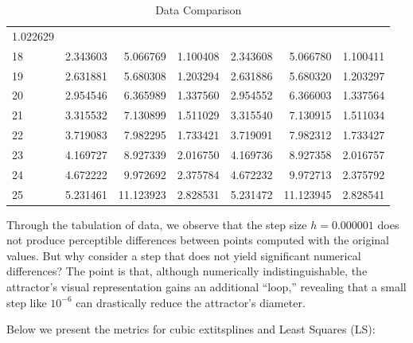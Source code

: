 \documentclass[12pt, a4paper]{article}
\begin{document}
\begin{table}[H]
\begin{tabular}{|l|r|r|r|r|r|r|}
			1.022629
			\\
			18 & 2.343603 & 5.066769  & 1.100408 & 2.343608     & 5.066780     &   
			1.100411
			\\
			19 & 2.631881 & 5.680308  & 1.203294 & 2.631886     & 5.680320     &   
			1.203297
			\\
			20 & 2.954546 & 6.365989  & 1.337560 & 2.954552     & 6.366003     &   
			1.337564
			\\
			21 & 3.315532 & 7.130899  & 1.511029 & 3.315540     & 7.130915     &   
			1.511034
			\\
			22 & 3.719083 & 7.982295  & 1.733421 & 3.719091     & 7.982312     &   
			1.733427
			\\
			23 & 4.169727 & 8.927339  & 2.016750 & 4.169736     & 8.927358     &   
			2.016757
			\\
			24 & 4.672222 & 9.972692  & 2.375784 & 4.672232     & 9.972713     &   
			2.375792
			\\
			25 & 5.231461 & 11.123923 & 2.828531 & 5.231472     & 11.123945    &   
			2.828541
			\\
			\hline
		\end{tabular}
		\caption{Data Comparison}
		\label{tab:comparison-original-var}
		
	\end{table}
	Through the tabulation of data, we observe that the step size $h = 0.000001$ does not produce perceptible differences between points computed with the original values. But why consider a step that does not yield significant numerical differences? The point is that, although numerically indistinguishable, the attractor's visual representation gains an additional ``loop,'' revealing that a small step like $10^{-6}$ can drastically reduce the attractor's diameter.
	
	Below we present the metrics for cubic 	extit{splines} and Least Squares (LS):
	
\end{document}
